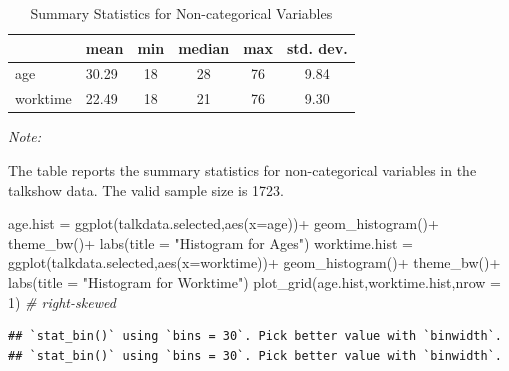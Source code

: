\documentclass[
  12pt,
]{article}
\newenvironment{Shaded}{\begin{snugshade}}{\end{snugshade}}
\newcommand{\AttributeTok}[1]{\textcolor[rgb]{0.77,0.63,0.00}{#1}}
\newcommand{\CommentTok}[1]{\textcolor[rgb]{0.56,0.35,0.01}{\textit{#1}}}
\newcommand{\DecValTok}[1]{\textcolor[rgb]{0.00,0.00,0.81}{#1}}
\newcommand{\FunctionTok}[1]{\textcolor[rgb]{0.00,0.00,0.00}{#1}}
\newcommand{\NormalTok}[1]{#1}
\newcommand{\OtherTok}[1]{\textcolor[rgb]{0.56,0.35,0.01}{#1}}
\newcommand{\SpecialCharTok}[1]{\textcolor[rgb]{0.00,0.00,0.00}{#1}}
\newcommand{\StringTok}[1]{\textcolor[rgb]{0.31,0.60,0.02}{#1}}
\begin{document}
\begin{table}[H]

\caption{\label{tab:unnamed-chunk-2}Summary Statistics for Non-categorical Variables}
\centering
\begin{threeparttable}
\begin{tabular}[t]{llcccc}
\toprule
  & mean & min & median & max & std. dev.\\
\midrule
age & 30.29 & 18 & 28 & 76 & 9.84\\
worktime & 22.49 & 18 & 21 & 76 & 9.30\\
\bottomrule
\end{tabular}
\begin{tablenotes}
\item \textit{Note: } 
\item The table reports the summary statistics for non-categorical variables in the talkshow data. The valid sample size is 1723.
\end{tablenotes}
\end{threeparttable}
\end{table}

\begin{Shaded}
\begin{Highlighting}[]
\NormalTok{age.hist }\OtherTok{=} \FunctionTok{ggplot}\NormalTok{(talkdata.selected,}\FunctionTok{aes}\NormalTok{(}\AttributeTok{x=}\NormalTok{age))}\SpecialCharTok{+}
  \FunctionTok{geom\_histogram}\NormalTok{()}\SpecialCharTok{+}
  \FunctionTok{theme\_bw}\NormalTok{()}\SpecialCharTok{+}
  \FunctionTok{labs}\NormalTok{(}\AttributeTok{title =} \StringTok{"Histogram for Ages"}\NormalTok{)}
\NormalTok{worktime.hist }\OtherTok{=} \FunctionTok{ggplot}\NormalTok{(talkdata.selected,}\FunctionTok{aes}\NormalTok{(}\AttributeTok{x=}\NormalTok{worktime))}\SpecialCharTok{+}
  \FunctionTok{geom\_histogram}\NormalTok{()}\SpecialCharTok{+}
  \FunctionTok{theme\_bw}\NormalTok{()}\SpecialCharTok{+}
  \FunctionTok{labs}\NormalTok{(}\AttributeTok{title =} \StringTok{"Histogram for Worktime"}\NormalTok{)}
\FunctionTok{plot\_grid}\NormalTok{(age.hist,worktime.hist,}\AttributeTok{nrow =} \DecValTok{1}\NormalTok{) }\CommentTok{\# right{-}skewed}
\end{Highlighting}
\end{Shaded}

\begin{verbatim}
## `stat_bin()` using `bins = 30`. Pick better value with `binwidth`.
## `stat_bin()` using `bins = 30`. Pick better value with `binwidth`.
\end{verbatim}
\end{document}
